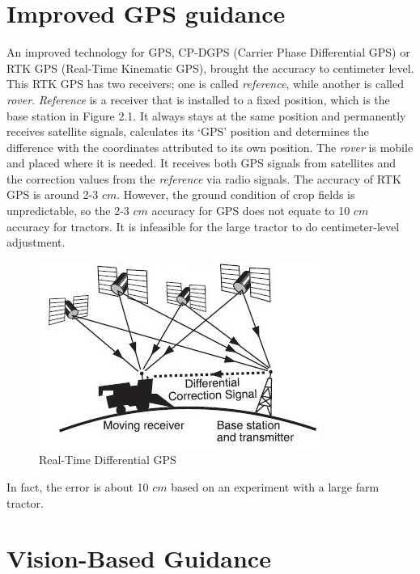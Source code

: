 \documentclass[letterpaper,12pt,oneside]{book}
\begin{document}
		\section{Improved GPS guidance}
		An improved technology for GPS, CP-DGPS (Carrier Phase Differential GPS) or RTK GPS (Real-Time Kinematic GPS), brought the accuracy to centimeter level. This RTK GPS has two receivers; one is called \textit{reference}, while another is called \textit{rover}. \textit{Reference} is a receiver that is installed to a fixed position, which is the base station in Figure 2.1. It always stays at the same position and permanently receives satellite signals, calculates its ‘GPS’ position and determines the difference with the coordinates attributed to its own position. The \textit{rover} is mobile and placed where it is needed. It receives both GPS signals from satellites and the correction values from the \textit{reference} via radio signals. The accuracy of RTK GPS is around 2-3 $cm$. \cite{lambiel2004contribution} However, the ground condition of crop fields is unpredictable, so the 2-3 $cm$ accuracy for GPS does not equate to 10 $cm$ accuracy for tractors. It is infeasible for the large tractor to do centimeter-level adjustment.
		\begin{figure}[ht!]
			\begin{center}
				\includegraphics[scale = 1.1]{RTGPS.jpg}
				\caption{Real-Time Differential GPS}
			\end{center}
		\end{figure}
		In fact, the error is about 10 $cm$ based on an experiment with a large farm tractor. \cite{thuilot2002automatic} 
		
		\section{Vision-Based Guidance}
		
\end{document}
